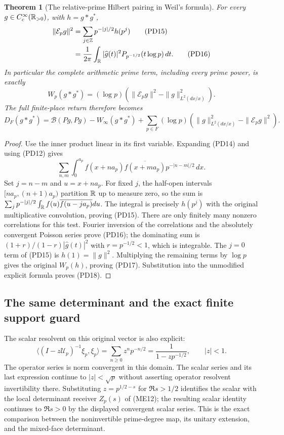 \documentclass[11pt,a4paper]{article}
\newtheorem{theorem}{Theorem}[section]
\theoremstyle{definition}\newtheorem{definition}[theorem]{Definition}
\newcommand{\Z}{\mathbb Z}\newcommand{\Q}{\mathbb Q}
\begin{document}
\begin{theorem}[The relative-prime Hilbert pairing in Weil's formula]
\label{thm:PD-Weil-energy}
For every $g\in C_c^\infty(\mathbb R_{>0})$, with $h=g*g^*$,
\begin{align}
 \|\mathcal E_pg\|^2
 &=\sum_{j\in\Z}p^{-|j|/2}h(p^j)\tag{PD15}\\
 &=\frac1{2\pi}\int_\R|\widehat g(t)|^2
 P_{p^{-1/2}}(t\log p)\,dt.\tag{PD16}
\end{align}
In particular the complete arithmetic prime term, including every prime
power, is exactly
\[
 W_p(g*g^*)=(\log p)
 \left(\|\mathcal E_pg\|^2-\|g\|_{L^2(dx/x)}^2\right).
 \tag{PD17}\label{eq:PD-prime-energy}
\]
The full finite-place return therefore becomes
\[
 D_F(g*g^*)=\mathscr B(Pg,Pg)-W_\infty(g*g^*)
 +\sum_{p\in F}(\log p)
 \left(\|g\|_{L^2(dx/x)}^2-\|\mathcal E_pg\|^2\right).
 \tag{PD18}\label{eq:PD-full-energy}
\]
\end{theorem}
\begin{proof}
Use the inner product linear in its first variable. Expanding (PD14)
and using (PD12) gives
\[
 \sum_{n,m}\int_0^{a_p}
 f(x+n a_p)\overline{f(x+m a_p)}p^{-|n-m|/2}\,dx.
\]
Set $j=n-m$ and $u=x+n a_p$. For fixed $j$, the half-open intervals
$[n a_p,(n+1)a_p)$ partition $\mathbb R$ up to measure zero, so the sum is
$\sum_jp^{-|j|/2}\int_\mathbb R f(u)\overline{f(u-j a_p)}du$.
The integral is precisely $h(p^j)$ with the original multiplicative
convolution, proving (PD15). There are only finitely many nonzero
correlations for this test. Fourier inversion of the correlations and
the absolutely convergent Poisson series prove (PD16); the dominating
sum is $(1+r)/(1-r)|\widehat g(t)|^2$ with $r=p^{-1/2}<1$,
which is integrable. The $j=0$ term of (PD15) is
$h(1)=\|g\|^2$. Multiplying the remaining terms by $\log p$
gives the original $W_p(h)$, proving (PD17). Substitution into the
unmodified explicit formula proves (PD18).
\end{proof}

\subsection{The same determinant and the exact finite support guard}
The scalar resolvent on this original vector is also explicit:
\[
 \langle (I-z\mathscr U_p)^{-1}\xi_p,\xi_p\rangle
 =\sum_{n\ge0}z^np^{-n/2}=
 \frac1{1-zp^{-1/2}},\qquad |z|<1.
 \tag{PD19}
\]
The operator series is norm convergent in this domain. The scalar series
and its last expression continue to $|z|<\sqrt p$ without asserting
operator resolvent invertibility there. Substituting
$z=p^{1/2-s}$ for $\Re s>1/2$ identifies the scalar with the local
determinant receiver $Z_p(s)$ of (ME12); the resulting scalar identity
continues to $\Re s>0$ by the displayed convergent scalar series.
This is the exact comparison between the noninvertible prime-degree
map, its unitary extension, and the mixed-face determinant.
\end{document}
